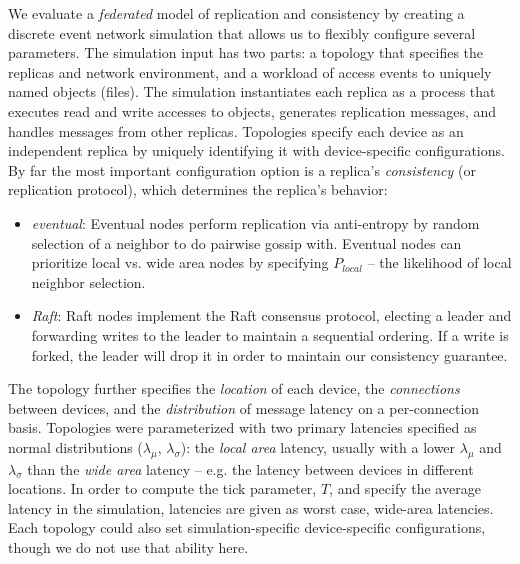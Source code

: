 \documentclass[10pt,conference,letterpaper]{IEEEtran}
\begin{document}

We evaluate a \emph{federated} model of replication and consistency by creating a
discrete event network simulation that allows us to flexibly configure several parameters.
The simulation input has two parts: a topology that specifies the replicas and
network environment, and a workload of access events to uniquely named objects
(files).
The simulation instantiates each replica as a process that executes read and
write accesses to objects, generates replication messages, and 
handles messages from other replicas.
Topologies specify each device as an independent replica by uniquely identifying it
with device-specific configurations.
By far the most important configuration option is a replica's \textit{consistency} (or replication
protocol), which determines the replica's behavior:
\begin{itemize}
    \item \emph{eventual}: Eventual nodes perform replication via anti-entropy by random
      selection of a neighbor to do pairwise gossip with. Eventual  nodes can prioritize
      local vs. wide area nodes by specifying $P_{local}$ -- the likelihood of local neighbor selection.
    \item \emph{Raft}: Raft nodes implement the Raft consensus protocol, electing a
      leader and forwarding writes to the leader to maintain a sequential  ordering. If a
      write is forked, the leader will drop it in order to maintain our consistency
      guarantee. 
\end{itemize}

The topology further specifies the \textit{location} of each device, the
\textit{connections} between devices, and the \textit{distribution} of message latency on
a per-connection basis.
Topologies were parameterized with two primary latencies specified as normal distributions ($\lambda_{\mu}$,
$\lambda_{\sigma}$): the \textit{local area} latency, usually with a lower $\lambda_{\mu}$
and $\lambda_{\sigma}$ than the \textit{wide area} latency -- e.g.
the latency between devices in different locations.
In order to compute the tick parameter, $T$, and specify the average latency in the
simulation, latencies are given as worst case, wide-area latencies.
Each topology could also set simulation-specific device-specific configurations, though we
do not use that ability here.
\end{document}
